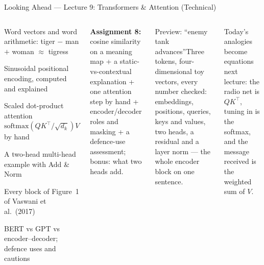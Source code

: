 \documentclass[aspectratio=169,10pt]{beamer}
\begin{document}
\begin{frame}{Looking Ahead --- Lecture 9: Transformers \& Attention (Technical)}
\begin{columns}[T]
\begin{tl}\item Word vectors and word arithmetic: tiger $-$ man $+$ woman $\approx$ tigress\item Sinusoidal positional encoding, computed and explained\item Scaled dot-product attention $\mathrm{softmax}(QK^{\top}/\sqrt{d_k})V$ by hand\item A two-head multi-head example with Add \& Norm\item Every block of Figure~1 of Vaswani et al.\ (2017)\item BERT vs GPT vs encoder--decoder; defence uses and cautions\end{tl}
\begin{ibox}\scriptsize\textbf{Assignment 8:} cosine similarity on a meaning map + a static-vs-contextual explanation + one attention step by hand + encoder/decoder roles and masking + a defence-use assessment; bonus: what two heads add.\end{ibox}
\begin{cbox}{Preview: ``enemy tank advances''}\scriptsize Three tokens, four-dimensional toy vectors, every number checked: embeddings, positions, queries, keys and values, two heads, a residual and a layer norm --- the whole encoder block on one sentence.\end{cbox}
\begin{rbox}\scriptsize Today's analogies become equations next lecture: the radio net is $QK^{\top}$, tuning in is the softmax, and the message received is the weighted sum of $V$.\end{rbox}
\end{columns}
\end{frame}
\end{document}
